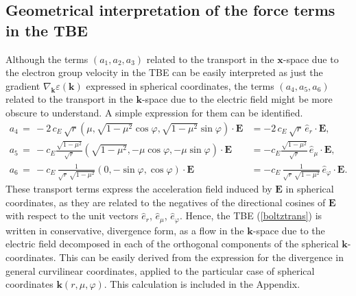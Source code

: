 \documentclass[11pt]{article}
\newcommand{\bk}{\mathbf{k}}
\newcommand{\bx}{\mathbf{x}}
\newcommand{\eps}{\varepsilon}
\newcommand{\bE}{\mathbf{E}}
\newcommand{\cd}[1]{c_{#1}}
\newcommand{\enk}{\eps(\bk)}
\begin{document}
%
%
%
\subsection{Geometrical interpretation of the force terms in the TBE}
%
%
Although the terms $(a_1,a_2,a_3)$ related to the transport in the
$\bx$-space due to the electron group 
velocity in the TBE can be easily interpreted as just the gradient $\nabla_{\bk} 
\enk$ expressed in spherical coordinates, the terms $(a_4,a_5,a_6)$ related to the transport in the 
$\bk$-space due to the electric field might be more obscure to understand.
A simple expression for them can be identified.
%
\begin{align}
a_{4} \, = \, 
- 2 \, \cd{E} \, \sqrt{r} \left(\mu,\sqrt{1 - \mu^{2}} \cos \varphi, \sqrt{1 - \mu^{2}}
\sin \varphi\right)\cdot \bE &  =   - 2 \, \cd{E} \, \sqrt{r} \, \hat{e}_r\cdot \bE, 
\\[5pt]
a_{5} \, = \, - \cd{E} \frac{\sqrt{1 - \mu^{2}}}{\sqrt{r}} \left( \sqrt{1 - \mu^{2}}, -
\mu \cos \varphi, - \mu \sin \varphi\right) \cdot \bE & =
 - \cd{E} \frac{\sqrt{1 - \mu^{2}}}{\sqrt{r}} \, \hat{e}_{\mu} \cdot \bE, 
\\ 
a_{6} \, = \, - \cd{E} \, \frac{1}{\sqrt{r} \, \sqrt{1 - \mu^{2}}} \left(0, -\sin \varphi, 
\cos \varphi \right) \cdot \bE &  =  - \cd{E} \, \frac{1}{\sqrt{r} \, \sqrt{1 - \mu^{2}}} \, \hat{e}_{\varphi} \cdot \bE. 
\end{align}
%
These transport terms express 
the acceleration field induced by $\bE$ in spherical coordinates,
as they are related to the negatives of the directional cosines of $\bE$ with respect to the 
unit vectors $\hat{e}_r$, $\hat{e}_{\mu}$, $\hat{e}_{\varphi}$.
Hence, the TBE (\ref{boltztrans}) is written in conservative, divergence form, as a flow in 
the $\bk$-space due to the electric field decomposed in each of the orthogonal components of the 
spherical $\bk$-coordinates. This can be easily derived from the expression for the divergence in
general curvilinear coordinates, applied to the particular case of spherical coordinates
$\bk(r,\mu,\varphi)$. This calculation is included in the Appendix.
%
%
%
\end{document}
